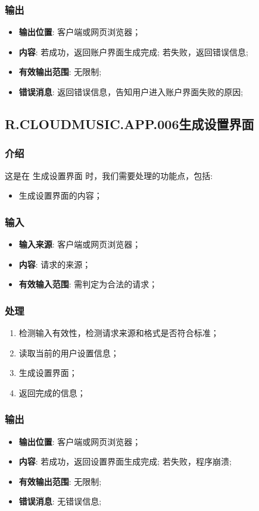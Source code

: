 \subsubsection{输出}
\begin{itemize}
	\item \textbf{输出位置}: 客户端或网页浏览器；
	\item \textbf{内容}: 若成功，返回账户界面生成完成; 若失败，返回错误信息;
	\item \textbf{有效输出范围}: 无限制;
	\item \textbf{错误消息}: 返回错误信息，告知用户进入账户界面失败的原因;
\end{itemize}
\subsection{R.CLOUDMUSIC.APP.006生成设置界面}
\subsubsection{介绍}
	这是在 生成设置界面 时，我们需要处理的功能点，包括: 
	\begin{itemize}
		\item 生成设置界面的内容；
	\end{itemize}
\subsubsection{输入}
	\begin{itemize}
		\item \textbf{输入来源}: 客户端或网页浏览器；
		\item \textbf{内容}: 请求的来源；
		\item \textbf{有效输入范围}: 需判定为合法的请求；
	\end{itemize}
\subsubsection{处理}
	\begin{enumerate}
		\item 检测输入有效性，检测请求来源和格式是否符合标准；
		\item 读取当前的用户设置信息；
		\item 生成设置界面；
		\item 返回完成的信息；
	\end{enumerate}
\subsubsection{输出}
\begin{itemize}
	\item \textbf{输出位置}: 客户端或网页浏览器；
	\item \textbf{内容}: 若成功，返回设置界面生成完成; 若失败，程序崩溃;
	\item \textbf{有效输出范围}: 无限制;
	\item \textbf{错误消息}: 无错误信息;
\end{itemize}
